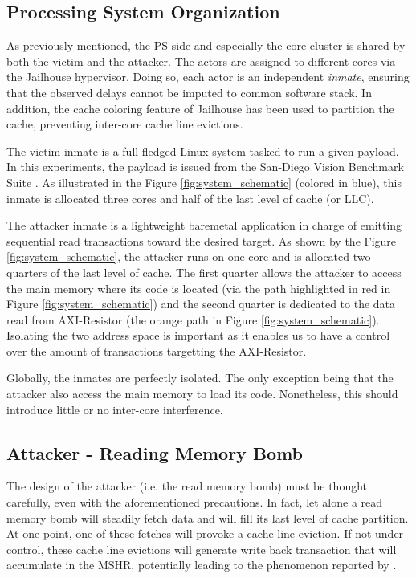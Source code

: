     \subsection{Processing System Organization}
        \label{subsec:processing_system_organization}
        As previously mentioned, the PS side and especially the core cluster is shared by both the victim and the attacker. The actors are assigned to different cores via the Jailhouse hypervisor\cite{jailhouse}. Doing so, each actor is an independent \emph{inmate}, ensuring that the observed delays cannot be imputed to common software stack. In addition, the cache coloring feature of Jailhouse has been used to partition the cache, preventing inter-core cache line evictions.

        The victim inmate is a full-fledged Linux system tasked to run a given payload. In this experiments, the payload is issued from the San-Diego Vision Benchmark Suite \cite{SD-VBS}. As illustrated in the Figure \ref{fig:system_schematic} (colored in blue), this inmate is allocated three cores and half of the last level of cache (or LLC).

        The attacker inmate is a lightweight baremetal application in charge of emitting sequential read transactions toward the desired target. As shown by the Figure \ref{fig:system_schematic}, the attacker runs on one core and is allocated two quarters of the last level of cache. The first quarter allows the attacker to access the main memory where its code is located (via the path highlighted in red in Figure \ref{fig:system_schematic}) and the second quarter is dedicated to the data read from AXI-Resistor (the orange path in Figure \ref{fig:system_schematic}). Isolating the two address space is important as it enables us to have a control over the amount of transactions targetting the AXI-Resistor.

        Globally, the inmates are perfectly isolated. The only exception being that the attacker also access the main memory to load its code. Nonetheless, this should introduce little or no inter-core interference.

    \subsection{Attacker - Reading Memory Bomb}
        \label{subsec:attacker_reading_memory_bomb}
        The design of the attacker (i.e. the read memory bomb) must be thought carefully, even with the aforementioned precautions. In fact, let alone a read memory bomb will steadily fetch data and will fill its last level of cache partition. At one point, one of these fetches will provoke a cache line eviction. If not under control, these cache line evictions will generate write back transaction that will accumulate in the MSHR, potentially leading to the phenomenon reported by \cite{Heechul_DDOS_attacks_on_shared_cache}.


